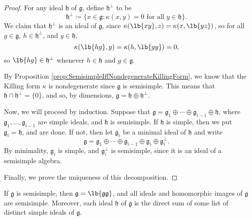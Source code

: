 \documentclass{article}
\DeclarePairedDelimiter\lb\lbrack\rbrack
\newcommand*\frkg{{\ensuremath{\mathfrak{g}}}}
\newcommand*\frkh{{\ensuremath{\mathfrak{h}}}}
\begin{document}
\begin{proof}
    For any ideal $\frkh$ of $\frkg$, define $\frkh^\perp$ to be 
    \[
        \frkh^\perp
        \coloneq
        \{ 
            x \in \frkg :
            \kappa(x,y) = 0 \text{ for all } y \in \frkh
        \}.
    \]
    We claim that $\frkh^\perp$ is an ideal of $\frkg$, since $\kappa(\lb{xy},z) = \kappa(x,\lb{yz})$, so for all $g \in \frkg$, $h \in \frkh^\perp$, and $y \in \frkh$,
    \[
        \kappa(\lb{hg},y)
        =
        \kappa(h,\lb{gy})
        =
        0,
    \]
    so $\lb{hg} \in \frkh^\perp$ whenever $h \in \frkh$ and $g \in \frkg$.

    By Proposition \ref{prop:SemisimpleIffNondegenerateKillingForm}, we know that the Killing form $\kappa$ is nondegenerate since $\frkg$ is semisimple.
    This means that $\frkh \cap \frkh^\perp = \{0\}$, and so, by dimensions, $\frkg = \frkh \oplus \frkh^\perp$.

    Now, we will proceed by induction.
    Suppose that $\frkg = \frkg_1 \oplus \cdots \oplus \frkg_{i-1} \oplus \frkh$, where $\frkg_1,\ldots,\frkg_{i-1}$ are simple ideals, and $\frkh$ is semisimple.
    If $\frkh$ is simple, then we put $\frkg_i = \frkh$, and are done. 
    If not, then let $\frkg_i$ be a minimal ideal of $\frkh$ and write
    \[
        \frkg 
        = 
        \frkg_1 \oplus \cdots \oplus \frkg_{i-1} 
        \oplus \frkg_i \oplus \frkg_i^\perp
        .
    \]
    By minimality, $\frkg_i$ is simple, and $\frkg_i^\perp$ is semisimple, since it is an ideal of a semisimple algebra.

    Finally, we prove the uniqueness of this decomposition.
\end{proof}

\begin{corollary}
    If $\frkg$ is semisimple, then $\frkg = \lb{\frkg\frkg}$, and all ideals and homomorphic images of $\frkg$ are semisimple.
    Moreover, each ideal $\frkh$ of $\frkg$ is the direct sum of some list of distinct simple ideals of $\frkg$.
\end{corollary}
\end{document}
